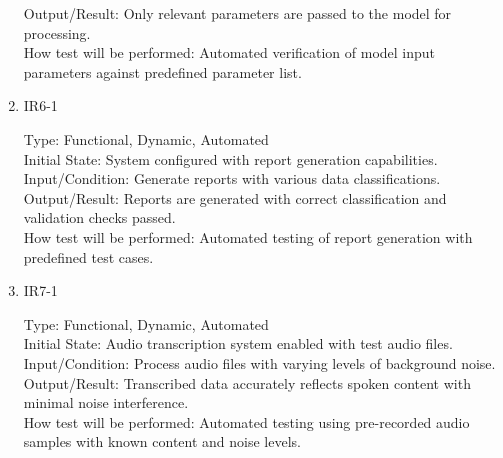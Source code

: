 \documentclass[12pt, titlepage]{article}
\begin{document}
\begin{enumerate}
    Output/Result: Only relevant parameters are passed to the model for processing.\\
    
    How test will be performed: Automated verification of model input parameters against predefined parameter list.

    \item{IR6-1\\}
    
    Type: Functional, Dynamic, Automated\\
    
    Initial State: System configured with report generation capabilities.\\
    
    Input/Condition: Generate reports with various data classifications.\\
    
    Output/Result: Reports are generated with correct classification and validation checks passed.\\
    
    How test will be performed: Automated testing of report generation with predefined test cases.

    \item{IR7-1\\}
    
    Type: Functional, Dynamic, Automated\\
    
    Initial State: Audio transcription system enabled with test audio files.\\
    
    Input/Condition: Process audio files with varying levels of background noise.\\
    
    Output/Result: Transcribed data accurately reflects spoken content with minimal noise interference.\\
    
    How test will be performed: Automated testing using pre-recorded audio samples with known content and noise levels.
\end{enumerate}

\newpage
\end{document}
